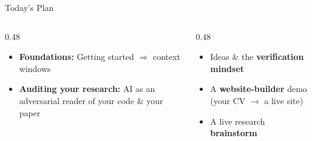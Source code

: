 \documentclass[aspectratio=169, 10pt]{beamer}
\begin{document}
\begin{frame}{Today's Plan}
\vskip2pt
\begin{columns}[T]
\begin{column}{0.48\textwidth}
\begin{tcolorbox}[keybox, title={\faCompass\quad Hour 1 --- Emily}]
\small
\begin{itemize}\setlength{\itemsep}{3pt}
  \item \textbf{Foundations:} Getting started $\Rightarrow$ context windows
  \item \textbf{Auditing your research:} AI as an adversarial reader of your code \& your paper
\end{itemize}
\end{tcolorbox}
\end{column}
\begin{column}{0.48\textwidth}
\begin{tcolorbox}[keybox, title={\faComments\quad Hour 2 --- Erkmen}]
\small
\begin{itemize}\setlength{\itemsep}{3pt}
  \item Ideas \& the \textbf{verification mindset}
  \item A \textbf{website-builder} demo (your CV $\rightarrow$ a live site)
  \item A live research \textbf{brainstorm}
\end{itemize}
\end{tcolorbox}
\end{column}
\end{columns}
\vskip8pt
\end{frame}
\end{document}
